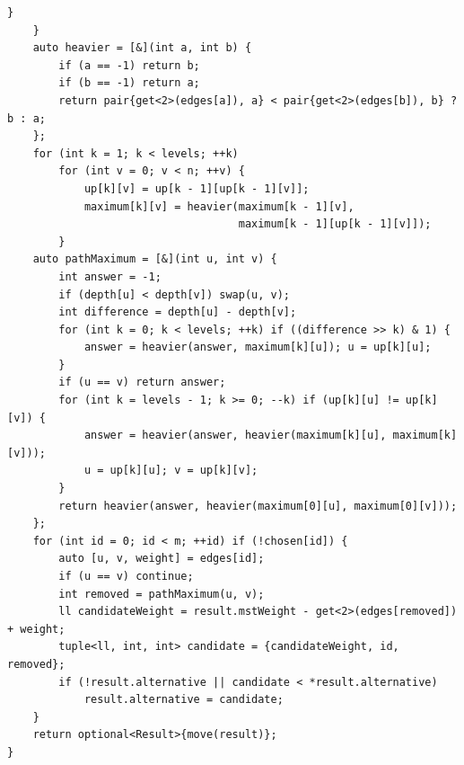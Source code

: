 \begin{lstlisting}[name=advanced_graph_second_mst]
        }
    }
    auto heavier = [&](int a, int b) {
        if (a == -1) return b;
        if (b == -1) return a;
        return pair{get<2>(edges[a]), a} < pair{get<2>(edges[b]), b} ? b : a;
    };
    for (int k = 1; k < levels; ++k)
        for (int v = 0; v < n; ++v) {
            up[k][v] = up[k - 1][up[k - 1][v]];
            maximum[k][v] = heavier(maximum[k - 1][v],
                                    maximum[k - 1][up[k - 1][v]]);
        }
    auto pathMaximum = [&](int u, int v) {
        int answer = -1;
        if (depth[u] < depth[v]) swap(u, v);
        int difference = depth[u] - depth[v];
        for (int k = 0; k < levels; ++k) if ((difference >> k) & 1) {
            answer = heavier(answer, maximum[k][u]); u = up[k][u];
        }
        if (u == v) return answer;
        for (int k = levels - 1; k >= 0; --k) if (up[k][u] != up[k][v]) {
            answer = heavier(answer, heavier(maximum[k][u], maximum[k][v]));
            u = up[k][u]; v = up[k][v];
        }
        return heavier(answer, heavier(maximum[0][u], maximum[0][v]));
    };
    for (int id = 0; id < m; ++id) if (!chosen[id]) {
        auto [u, v, weight] = edges[id];
        if (u == v) continue;
        int removed = pathMaximum(u, v);
        ll candidateWeight = result.mstWeight - get<2>(edges[removed]) + weight;
        tuple<ll, int, int> candidate = {candidateWeight, id, removed};
        if (!result.alternative || candidate < *result.alternative)
            result.alternative = candidate;
    }
    return optional<Result>{move(result)};
}
\end{lstlisting}
%

\fi
